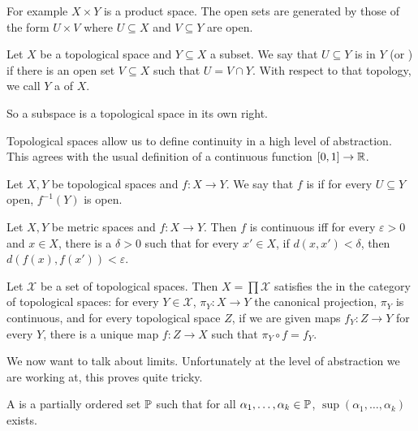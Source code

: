 For example $X \times Y$ is a product space. The open sets are generated by those of the form $U \times V$ where $U \subseteq X$ and $V \subseteq Y$ are open.

\begin{definition}
Let $X$ be a topological space and $Y \subseteq X$ a subset.
We say that $U \subseteq Y$ is  in $Y$ (or ) if there is an open set $V \subseteq X$ such that $U = V \cap Y$.
With respect to that topology, we call $Y$ a  of $X$.
\end{definition}

So a subspace is a topological space in its own right.

Topological spaces allow us to define continuity in a high level of abstraction. This agrees with the usual definition of a continuous function $[0, 1] \to \mathbb{R}$.

\begin{definition}
Let $X,Y$ be topological spaces and $f: X \to Y$. We say that $f$ is  if for every $U \subseteq Y$ open, $f^{-1}(Y)$ is open.
\end{definition}

\begin{lemma}
Let $X,Y$ be metric spaces and $f: X \to Y$. Then $f$ is continuous iff for every $\varepsilon > 0$ and $x \in X$, there is a $\delta > 0$ such that for every $x' \in X$, if $d(x, x') < \delta$, then $d(f(x), f(x')) < \varepsilon$.
\end{lemma}

\begin{lemma}
Let $\mathcal X$ be a set of topological spaces. Then $X = \prod \mathcal X$ satisfies the  in the category of topological spaces: for every $Y \in \mathcal X$, $\pi_Y: X \to Y$ the canonical projection, $\pi_Y$ is continuous, and for every topological space $Z$, if we are given maps $f_Y: Z \to Y$ for every $Y$, there is a unique map $f: Z \to X$ such that $\pi_Y \circ f = f_Y$.
\end{lemma}

We now want to talk about limits. Unfortunately at the level of abstraction we are working at, this proves quite tricky.

\begin{definition}
A  is a partially ordered set $\mathbb{P}$ such that for all $\alpha_1, \dots, \alpha_k \in \mathbb{P}$, $\sup(\alpha_1, \dots, \alpha_k)$ exists.
\end{definition}

